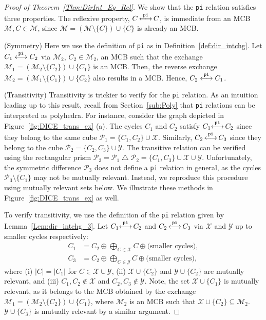 \documentclass[fleqn,11pt]{article}
\newcommand\calM{\mathcal{M}}
\newcommand\calP{\mathcal{P}}     %
\newcommand\calX{\mathcal{X}}     %
\newcommand\calY{\mathcal{Y}}
\newcommand\symdiff{\mathop{\triangle}}
\newcommand\pInt{ \stackrel{\tt pi}{\longleftrightarrow} }
\begin{document}
\begin{proof}[Proof of Theorem~\ref{Thm:DirInt_Eq_Rel}]
	We show that the {\tt pi} relation satisfies three properties. The reflexive property, $C\,{\pInt}\, C$, is immediate from an MCB $\calM,C\in\calM$, since $\calM=(\calM\setminus\{C\})\cup\{C\}$ is already an MCB.
	
	
	(Symmetry) Here we use the definition of {\tt pi} as in Definition~\ref{def:dir_intchg}. Let $C_1\pInt C_2$ via $\calM_2$, $C_2\in\calM_2$, an MCB such that the exchange $\calM_1=(\calM_2\setminus\{C_2\})\cup\{C_1\}$ is an MCB. Then, the reverse exchange $\calM_2=(\calM_1\setminus\{C_1\})\cup\{C_2\}$ also results in a MCB. Hence, $C_2\pInt C_1$.
	
	
	(Transitivity) Transitivity is trickier to verify for the {\tt pi} relation. As an intuition leading up to this result, recall from Section~\ref{sub:Poly} that {\tt pi} relations can be interpreted as polyhedra. For instance, consider the graph depicted in Figure~\ref{fig:DICE_trans_ex} (a). The cycles $C_1$ and $C_2$ satisfy $C_1{\pInt}\, C_2$ since they belong to the same cube $\calP_1=\{C_1,C_2\}\cup\calX$. Similarly, $C_2\,{\pInt}\, C_3$ since they belong to the cube $\calP_2=\{C_2,C_3\}\cup\calY$. The transitive relation can be verified using the rectangular prism $\calP_3=\calP_1\symdiff\calP_2 = \{C_1,C_3\}\cup\calX\cup\calY$. Unfortunately, the symmetric difference $\calP_3$ does not define a {\tt pi} relation in general, as the cycles $\calP_3\setminus\{C_1\}$ may not be mutually relevant. Instead, we reproduce this procedure using mutually relevant sets below. We illustrate these methods in Figure~\ref{fig:DICE_trans_ex} as well.
	
	To verify transitivity, we use the definition of the {\tt pi} relation given by Lemma~\ref{Lem:dir_intchg_3}. 
	Let $C_1{\pInt}\, C_2$ and $C_2\,{\pInt}\, C_3$ via $\calX$ and $\calY$ up to smaller cycles respectively:
	\begin{align}
		C_1 &= C_2 \oplus \bigoplus_{C\in\calX} C \oplus\text{(smaller cycles)}, 
		\label{Eq:C1C2DirEx}
		\\
		C_3 &= C_2 \oplus \bigoplus_{C\in\calY} C\oplus\text{(smaller cycles)},
		\label{Eq:C2C3DirEx}
	\end{align}
	where (i) $|C|=|C_1|$ for $C\in\calX\cup\calY$, (ii) $\calX\cup\{C_2\}$ and $\calY\cup\{C_2\}$ are mutually relevant, and  (iii) $C_1,C_2\notin\calX$ and $C_2,C_3\notin\calY$.
	Note, the set $\calX\cup\{C_1\}$ is mutually relevant, as it belongs to the MCB obtained by the exchange $\calM_1=(\calM_2\setminus\{C_2\})\cup\{C_1\}$, where $\calM_2$ is an MCB such that $\calX\cup\{C_2\}\subseteq\calM_2$.
	$\calY\cup\{C_3\}$ is mutually relevant by a similar argument.
	

\end{proof}
\end{document}

